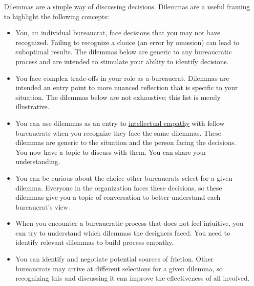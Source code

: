 Dilemmas are a \href{https://en.wikipedia.org/wiki/Defeasible_reasoning}{simple way}
\iftoggle{WPinmargin}{\marginpar{[Wikipedia] Defeasible\\reasoning}}{}
of discussing decisions. %
Dilemmas are a useful framing to highlight the following concepts:
\begin{itemize}
    \item You, an individual bureaucrat, face decisions that you may not have recognized. Failing to recognize a choice (an error by omission) can lead to suboptimal results. The dilemmas below are generic to any bureaucratic process and are intended to stimulate your ability to identify decisions. 
    \item You face complex trade-offs in your role as a bureaucrat. Dilemmas are intended an entry point to more nuanced reflection that is specific to your situation. The dilemmas below are not exhaustive; this list is merely illustrative. 
    \item You can use dilemmas as an entry to \href{https://en.wikipedia.org/wiki/Theory_of_mind}{intellectual empathy} 
    \iftoggle{WPinmargin}{\marginpar{[Wikipedia] Theory\\of mind}}{}
    with fellow bureaucrats when you recognize they face the same dilemmas. These dilemmas are generic to the situation and the person facing the decisions. You now have a topic to discuss with them. You can share your understanding. 
    \item You can be curious about the choice other bureaucrats select for a given dilemma. Everyone in the organization faces these decisions, so these dilemmas give you a topic of conversation to better understand each bureaucrat's view.
    \item When you encounter a bureaucratic process that does not feel intuitive, 
    you can try to understand which dilemmas the designers faced. 
    You need to identify relevant dilemmas to build \gls{process empathy}. \iftoggle{glossaryinmargin}{\marginpar{[Glossary]}}{}
    \item You can identify and negotiate potential sources of friction. Other bureaucrats may arrive at different selections for a given dilemma, so recognizing this and discussing it can improve the effectiveness of all involved.
\end{itemize}


